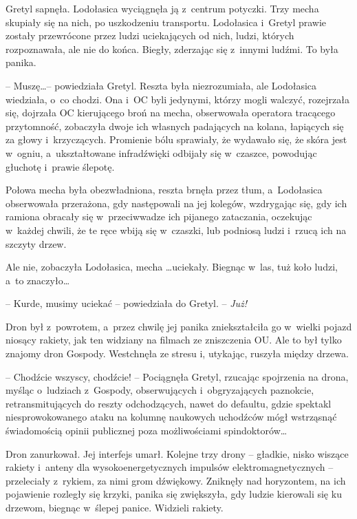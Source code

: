 \documentclass[oneside,polish,11pt,sfheadings]{mwbk}
\begin{document}
Gretyl sapnęła. Lodołasica wyciągnęła ją z~centrum potyczki. Trzy mecha
skupiały się na nich, po uszkodzeniu transportu. Lodołasica i~Gretyl
prawie zostały przewrócone przez ludzi uciekających od nich, ludzi,
których rozpoznawała, ale nie do końca. Biegły, zderzając się z~innymi
ludźmi. To była panika.

-- Muszę\ldots  -- powiedziała Gretyl. Reszta była niezrozumiała, ale
Lodołasica wiedziała, o~co chodzi. Ona i~OC byli jedynymi, którzy mogli
walczyć, rozejrzała się, dojrzała OC kierującego broń na mecha,
obserwowała operatora tracącego przytomność, zobaczyła dwoje ich
własnych padających na kolana, łapiących się za głowy i~krzyczących.
Promienie bólu sprawiały, że wydawało się, że skóra jest w~ogniu, a~ukształtowane infradźwięki odbijały się w~czaszce, powodując głuchotę i~prawie ślepotę.

Połowa mecha była obezwładniona, reszta brnęła przez tłum, a~Lodołasica
obserwowała przerażona, gdy następowali na jej kolegów, wzdrygając się,
gdy ich ramiona obracały się w~przeciwwadze ich pijanego zataczania,
oczekując w~każdej chwili, że te ręce wbiją się w~czaszki, lub podniosą
ludzi i~rzucą ich na szczyty drzew.

Ale nie, zobaczyła Lodołasica, mecha \ldots  uciekały. Biegnąc w~las, tuż
koło ludzi, a~to znaczyło\ldots 

-- Kurde, musimy uciekać -- powiedziała do Gretyl. -- \textit{Już!}

Dron był z~powrotem, a~przez chwilę jej panika zniekształciła go w~wielki pojazd niosący rakiety, jak ten widziany na filmach ze
zniszczenia OU. Ale to był tylko znajomy dron Gospody. Westchnęła ze
stresu i, utykając, ruszyła między drzewa. 

-- Chodźcie wszyscy, chodźcie!
-- Pociągnęła Gretyl, rzucając spojrzenia na drona, myśląc o~ludziach z~Gospody, obserwujących i~obgryzających paznokcie, retransmitujących do
reszty odchodzących, nawet do defaultu, gdzie spektakl niesprowokowanego
ataku na kolumnę naukowych uchodźców mógł wstrząsnąć świadomością opinii
publicznej poza możliwościami spindoktorów\ldots 

Dron zanurkował. Jej interfejs umarł. Kolejne trzy drony -- gładkie,
nisko wiszące rakiety i~anteny dla wysokoenergetycznych impulsów
elektromagnetycznych -- przeleciały z~rykiem, za nimi grom dźwiękowy.
Zniknęły nad horyzontem, na ich pojawienie rozległy się krzyki, panika
się zwiększyła, gdy ludzie kierowali się ku drzewom, biegnąc w~ślepej
panice. Widzieli rakiety.
\end{document}
